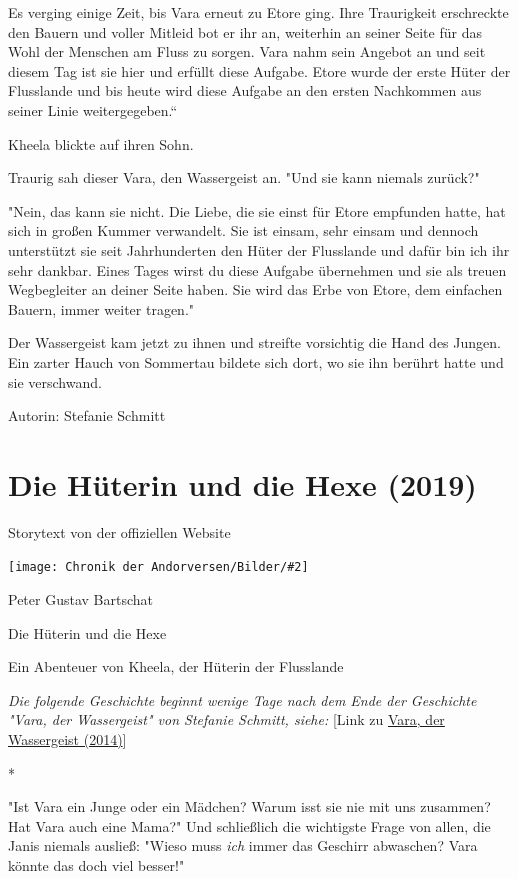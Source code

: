 \documentclass[10pt, a4paper, oneside]{book}
\newcommand{\fillbreak}{\vspace*{\fill}\columnbreak}
\newcommand{\storytext}[1]{%
    \section{#1}%
    \label{Storytext: #1}%
}
\newcommand{\refstorytext}[1]{\hyperref[Storytext: #1]{#1}}
\newcommand{\bildmitts}[2][height=0.32\textwidth,width=0.48\textwidth,keepaspectratio]{%
    \begin{center}
        \texttt{[image: Chronik der Andorversen/Bilder/\#2]}
    \end{center}
}
\begin{document}
\begin{multicols}{2}
Es verging einige Zeit, bis Vara erneut zu Etore ging. Ihre Traurigkeit erschreckte den Bauern und voller Mitleid bot er ihr an, weiterhin an seiner Seite für das Wohl der Menschen am Fluss zu sorgen. Vara nahm sein Angebot an und seit diesem Tag ist sie hier und erfüllt diese Aufgabe. Etore wurde der erste Hüter der Flusslande und bis heute wird diese Aufgabe an den ersten Nachkommen aus seiner Linie weitergegeben.“

Kheela blickte auf ihren Sohn.

Traurig sah dieser Vara, den Wassergeist an. "Und sie kann niemals zurück?"

"Nein, das kann sie nicht. Die Liebe, die sie einst für Etore empfunden hatte, hat sich in großen Kummer verwandelt. Sie ist einsam, sehr einsam und dennoch unterstützt sie seit Jahrhunderten den Hüter der Flusslande und dafür bin ich ihr sehr dankbar. Eines Tages wirst du diese Aufgabe übernehmen und sie als treuen Wegbegleiter an deiner Seite haben. Sie wird das Erbe von Etore, dem einfachen Bauern, immer weiter tragen."

Der Wassergeist kam jetzt zu ihnen und streifte vorsichtig die Hand des Jungen.  Ein zarter Hauch von Sommertau bildete sich dort, wo sie ihn berührt hatte und sie verschwand.\bigskip

Autorin: Stefanie Schmitt




\fillbreak
\storytext{Die Hüterin und die Hexe (2019)}

\begin{center}
    Storytext von der offiziellen Website
\end{center}

\bildmitts{Die Hüterin und die Hexe Bild 1.jpg}

Peter Gustav Bartschat

Die Hüterin und die Hexe

Ein Abenteuer von Kheela, der Hüterin der Flusslande\bigskip

\textit{Die folgende Geschichte beginnt wenige Tage nach dem Ende der Geschichte "Vara, der Wassergeist" von Stefanie Schmitt, siehe:} [Link zu \refstorytext{Vara, der Wassergeist (2014)}]

\begin{center}
    * 
\end{center}

"Ist Vara ein Junge oder ein Mädchen? Warum isst sie nie mit uns zusammen? 
Hat Vara auch eine Mama?" Und schließlich die wichtigste Frage von allen, die Janis niemals ausließ: "Wieso muss \textit{ich} immer das Geschirr abwaschen? Vara könnte das doch viel besser!" 


\end{multicols}
\end{document}
